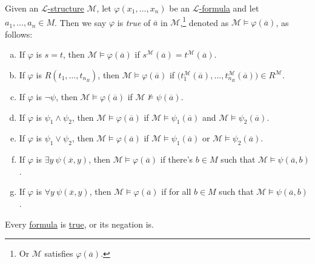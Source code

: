 \begin{definition}[Truth]\label{def:truth}
	Given an \hyperref[def:structure]{\(\mathcal{L} \)-structure} \(\mathcal{M} \), let \(\varphi (x_1, \dots , x_n)\) be an \hyperref[def:formula]{\(\mathcal{L} \)-formula} and let \(a_1, \dots , a_n\in M\). Then we say \(\varphi \) is \emph{true} of \(\overline{a} \) in \(\mathcal{M} \),\footnote{Or \(\mathcal{M} \) satisfies \(\varphi (\overline{a} )\).} denoted as \(\mathcal{M} \models \varphi (\overline{a} )\), as follows:
	\begin{enumerate}[(a)]
		\item If \(\varphi \) is \(s=t\), then \(\mathcal{M} \models \varphi (\overline{a} )\) if \(s^{\mathcal{M}} (\overline{a} ) = t^{\mathcal{M} } (\overline{a} )\).
		\item If \(\varphi \) is \(R(t_1, \dots , t_{n_R})\), then \(\mathcal{M} \models \varphi (\overline{a} )\) if \(\big( t^{\mathcal{M} }_1(\overline{a} ), \dots , t^{\mathcal{M} }_{n_R}(\overline{a} )  \big)\in R^{\mathcal{M} }\).
		\item If \(\varphi \) is \(\lnot \psi \), then \(\mathcal{M} \models \varphi (\overline{a} )\) if \(\mathcal{M} \not\models \psi (\overline{a} )\).
		\item If \(\varphi \) is \(\psi _1\land \psi _2\), then \(\mathcal{M} \models \varphi (\overline{a} )\) if \(\mathcal{M} \models \psi _1(\overline{a} )\) and \(\mathcal{M} \models \psi _2(\overline{a} )\).
		\item If \(\varphi \) is \(\psi _1\lor \psi _2\), then \(\mathcal{M} \models \varphi (\overline{a} )\) if \(\mathcal{M} \models \psi _1(\overline{a} )\) or \(\mathcal{M} \models \psi _2(\overline{a} )\).
		\item If \(\varphi \) is \(\exists y\ \psi (\overline{x} , y)\), then \(\mathcal{M} \models \varphi (\overline{a} )\) if there's \(b\in M\) such that \(\mathcal{M} \models \psi (\overline{a} , b)\).
		\item If \(\varphi \) is \(\forall y\ \psi (\overline{x} , y)\), then \(\mathcal{M} \models \varphi (\overline{a} )\) if for all \(b\in M\) such that \(\mathcal{M} \models \psi (\overline{a} , b)\).
	\end{enumerate}
\end{definition}

\begin{remark}
	Every \hyperref[def:formula]{formula} is \hyperref[def:truth]{true}, or its negation is.
\end{remark}
